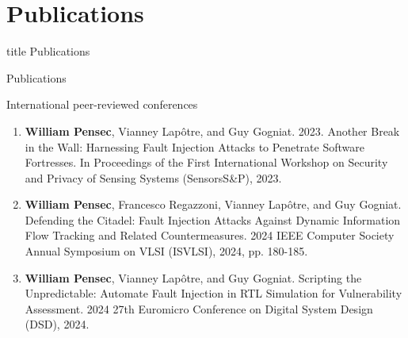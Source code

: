 \section*{Publications}

\begin{frame}
    \vfill
    \centering
    \begin{beamercolorbox}[sep=8pt,center,shadow=true,rounded=true]{title}
         Publications
    \end{beamercolorbox}
    \vfill
\end{frame}

\begin{frame}[noframenumbering]{Publications}
    \begin{block}{International peer-reviewed conferences}
        \begin{enumerate}
            \item \textbf{William Pensec}, Vianney Lapôtre, and Guy Gogniat. 2023. Another Break in the Wall: Harnessing Fault Injection Attacks to Penetrate Software Fortresses. In Proceedings of the First International Workshop on Security and Privacy of Sensing Systems (SensorsS\&P), 2023.~\cite{PLG-22-SensorsSP}
            \item \textbf{William Pensec}, Francesco Regazzoni, Vianney Lapôtre, and Guy Gogniat. Defending the Citadel: Fault Injection Attacks Against Dynamic Information Flow Tracking and Related Countermeasures. 2024 IEEE Computer Society Annual Symposium on VLSI (ISVLSI), 2024, pp. 180-185.~\cite{PRLG-24-isvlsi}
            \item \textbf{William Pensec}, Vianney Lapôtre, and Guy Gogniat. Scripting the Unpredictable: Automate Fault Injection in RTL Simulation for Vulnerability Assessment. 2024 27th Euromicro Conference on Digital System Design (DSD), 2024.~\cite{PLG-24-dsd}
        \end{enumerate}
    \end{block}
\end{frame}
